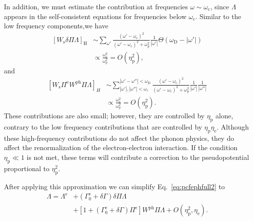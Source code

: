 \documentclass[%
 reprint,
superscriptaddress,
 amsmath,amssymb,
 aps,
prx,
]{revtex4-2}
\newcommand{\txc}{\text{c}}
\newcommand{\txe}{\text{e}}
\newcommand{\txp}{\text{p}}
\newcommand{\txs}{\text{s}}
\newcommand{\txD}{\text{D}}
\newcommand{\txph}{\text{ph}}
\newcommand{\pcf}{\Lambda} %
\begin{document}
\begin{appendices}
In addition, we must estimate the contribution at frequencies $\omega\sim\omega_\txc$, since $\Lambda$ appears in the self-consistent equations for frequencies below $\omega_\txc$.
Similar to the low frequency components,we have
\begin{equation}
  \begin{split}
  \left[W_\txs\delta\Pi \pcf\right]_\text{H}&\sim\sum_{\omega'}\frac{{\left(\omega'-\omega_\txc\right)}^2}{{\left(\omega'-\omega_\txc\right)}^2+\omega_\txp^2}
  \frac{1}{|\omega'|}\Theta(\omega_\txD-|\omega'|) \\
  &\propto \frac{\omega_\txc^2}{\omega_\txp^2}=O(\eta_\txp^2),
    \end{split}
\end{equation}
and
\begin{equation}
  \begin{split}
\label{eq:WPiWPiR_H}
\left[W_\txs\Pi^{\txe} W^{\txph}\Pi \pcf\right]_{H} &\sim\sum_{|\omega'|, |\omega''|<\omega_\txc}^{|\omega'-\omega''|<\omega_\txD}
\frac{{\left(\omega'-\omega_\txc\right)}^2}{{\left(\omega'-\omega_\txc\right)}^2+\omega_\txp^2}
\frac{1}{|\omega'|}\frac{1}{|\omega''|}\\
&\propto \frac{{\omega_\txc^2}}{\omega_\txp^2}=O(\eta_\txp^2).
  \end{split}
\end{equation}
These contributions are also small; however, they are controlled by $\eta_\txp$ alone, contrary to the low frequency contributions that are controlled by $\eta_\txp\eta_\txe$.
Although these high-frequency contributions do not affect the phonon physics, they do affect the renormalization of the electron-electron interaction. 
If the condition $\eta_\txp \ll 1$ is not met, these terms will contribute a correction to the pseudopotential proportional to $\eta_\txp^2$.

After applying this approximation
we can simplify Eq.~\eqref{eq:pcfephfull2} to
\begin{equation}
    \begin{split}
  \pcf  = \pcf^{\txe}&+ (\Gamma_0^{\txe}+\delta{\Gamma})\delta\Pi \pcf  \\
  &+
  [1+(\Gamma_0^{\txe}+\delta{\Gamma})\Pi^{\txe}]W^{\txph}\Pi \pcf+O(\eta_\txp^2,\eta_\txe).
    \end{split}
\end{equation}


\end{appendices}
\end{document}
